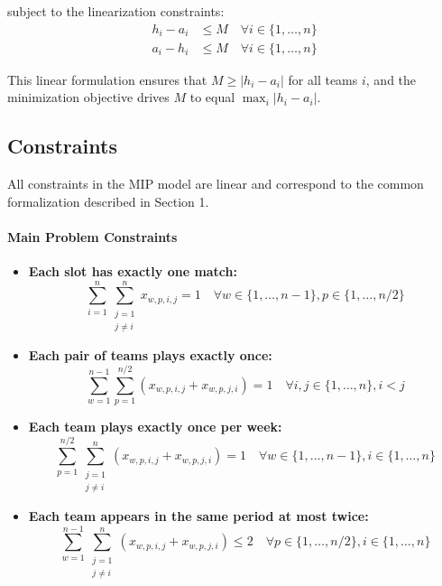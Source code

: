 \documentclass[11pt]{article}
\begin{document}
subject to the linearization constraints:
\begin{align}
h_i - a_i &\leq M \quad \forall i \in \{1, \ldots, n\} \\
a_i - h_i &\leq M \quad \forall i \in \{1, \ldots, n\}
\end{align}

This linear formulation ensures that $M \geq |h_i - a_i|$ for all teams $i$, and the minimization objective drives $M$ to equal $\max_{i} |h_i - a_i|$.

\subsection{Constraints}

All constraints in the MIP model are linear and correspond to the common formalization described in Section 1.

\paragraph{Main Problem Constraints}

\begin{itemize}
    \item \textbf{Each slot has exactly one match:}
    \begin{equation}
        \sum_{i=1}^{n} \sum_{\substack{j=1 \\ j \neq i}}^{n} x_{w,p,i,j} = 1 \quad \forall w \in \{1, \ldots, n-1\}, p \in \{1, \ldots, n/2\}
    \end{equation}

    \item \textbf{Each pair of teams plays exactly once:}
    \begin{equation}
        \sum_{w=1}^{n-1} \sum_{p=1}^{n/2} (x_{w,p,i,j} + x_{w,p,j,i}) = 1 \quad \forall i,j \in \{1, \ldots, n\}, i < j
    \end{equation}

    \item \textbf{Each team plays exactly once per week:}
    \begin{equation}
        \sum_{p=1}^{n/2} \sum_{\substack{j=1 \\ j \neq i}}^{n} (x_{w,p,i,j} + x_{w,p,j,i}) = 1 \quad \forall w \in \{1, \ldots, n-1\}, i \in \{1, \ldots, n\}
    \end{equation}

    \item \textbf{Each team appears in the same period at most twice:}
    \begin{equation}
        \sum_{w=1}^{n-1} \sum_{\substack{j=1 \\ j \neq i}}^{n} (x_{w,p,i,j} + x_{w,p,j,i}) \leq 2 \quad \forall p \in \{1, \ldots, n/2\}, i \in \{1, \ldots, n\}
    \end{equation}
\end{itemize}
\end{document}
